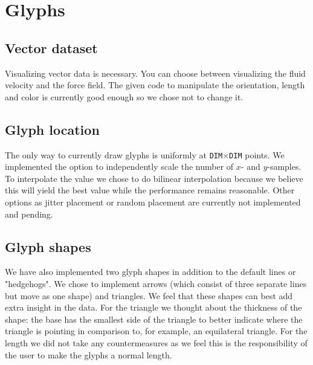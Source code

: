 \section{Glyphs}
	\subsection*{Vector dataset}
 		Visualizing vector data is necessary.
 		You can choose between visualizing the fluid velocity and the force field.
 		The given code to manipulate the orientation, length and color is currently good enough so we chose not to change it. 
	\subsection*{Glyph location}
		The only way to currently draw glyphs is uniformly at \texttt{DIM}$\times$\texttt{DIM} points.
		We implemented the option to independently scale the number of $x$- and $y$-samples.
		To interpolate the value we chose to do bilinear interpolation because we believe this will yield the best value while the performance remains reasonable.
		Other options as jitter placement or random placement are currently not implemented and pending. 

	\subsection*{Glyph shapes}
		We have also implemented two glyph shapes in addition to the default lines or "hedgehogs".
		We chose to implement arrows (which consist of three separate lines but move as one shape) and triangles.
		We feel that these shapes can best add extra insight in the data.
		For the triangle we thought about the thickness of the shape: the base has the smallest side of the triangle to better indicate where the triangle is pointing in comparison to, for example, an equilateral triangle.
		For the length we did not take any countermeasures as we feel this is the responsibility of the user to make the glyphs a normal length. 

